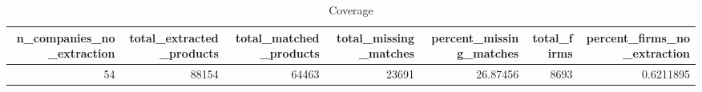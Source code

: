 \begin{table}

\caption{Coverage}
\centering
\begin{tabular}[t]{rrrrrrr}
\toprule
n\_companies\_no\_extraction & total\_extracted\_products & total\_matched\_products & total\_missing\_matches & percent\_missing\_matches & total\_firms & percent\_firms\_no\_extraction\\
\midrule
54 & 88154 & 64463 & 23691 & 26.87456 & 8693 & 0.6211895\\
\bottomrule
\end{tabular}
\end{table}
